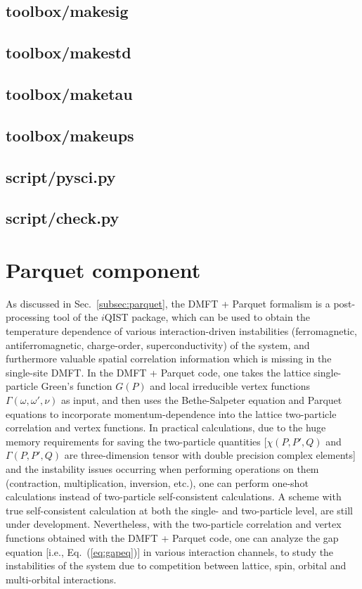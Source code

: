 \subsection{toolbox/makesig}
\subsection{toolbox/makestd}
\subsection{toolbox/maketau}
\subsection{toolbox/makeups}
\subsection{script/pysci.py}
\subsection{script/check.py}
\section{Parquet component}
As discussed in Sec.~\ref{subsec:parquet}, the DMFT + Parquet formalism is a post-processing tool of the $i$QIST package, which can be used to obtain the temperature dependence of various interaction-driven instabilities (ferromagnetic, antiferromagnetic, charge-order, superconductivity) of the system, and furthermore valuable spatial correlation information which is missing in the single-site DMFT. In the DMFT + Parquet code, one takes the lattice single-particle Green's function $G(P)$ and local irreducible vertex functions $\Gamma(\omega,\omega',\nu)$ as input, and then uses the Bethe-Salpeter equation and Parquet equations to incorporate momentum-dependence into the lattice two-particle correlation and vertex functions. In practical calculations, due to the huge memory requirements for saving the two-particle quantities [$\chi(P,P',Q)$ and $\Gamma(P,P',Q)$ are three-dimension tensor with double precision complex elements] and the instability issues occurring when performing operations on them (contraction, multiplication, inversion, etc.), one can perform one-shot calculations instead of two-particle self-consistent calculations. A scheme with true self-consistent calculation at both the single- and two-particle level, are still under development. Nevertheless, with the two-particle correlation and vertex functions obtained with the DMFT + Parquet code, one can  analyze the gap equation [i.e., Eq.~(\ref{eq:gapeq})] in various interaction channels, to study the instabilities of the system due to competition between lattice, spin, orbital and multi-orbital interactions.
